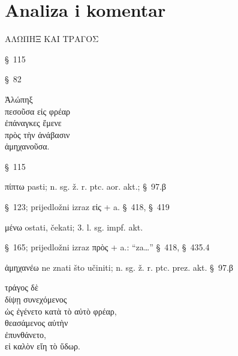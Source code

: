 \section*{Analiza i komentar}


{\large
\begin{greek}
\noindent ΑΛΩΠΗΞ ΚΑΙ ΤΡΑΓΟΣ\\

\end{greek}
}

\begin{description}[noitemsep]
\item[ΑΛΩΠΗΞ] §~115
\item[ΤΡΑΓΟΣ] §~82
\end{description}


{\large
\begin{greek}
\noindent Ἀλώπηξ \\
\tabto{2em} πεσοῦσα εἰς φρέαρ \\
ἐπάναγκες ἔμενε \\
\tabto{2em} πρὸς τὴν ἀνάβασιν \\
\tabto{4em} ἀμηχανοῦσα. \\

\end{greek}
}

\begin{description}[noitemsep]
\item[Ἀλώπηξ] §~115
\item[πεσοῦσα] πίπτω pasti; n. sg. ž. r. ptc. aor. akt.; §~97.β
\item[εἰς φρέαρ] §~123; prijedložni izraz εἰς + a. §~418, §~419
\item[ἔμενε] μένω ostati, čekati; 3. l. sg. impf. akt.
\item[πρὸς τὴν ἀνάβασιν] §~165; prijedložni izraz πρὸς + a.: ``za\dots''  §~418, §~435.4
\item[ἀμηχανοῦσα] ἀμηχανέω ne znati što učiniti; n. sg. ž. r. ptc. prez. akt. §~97.β

\end{description}


{\large
\begin{greek}
\noindent τράγος δὲ\\
\tabto{2em} δίψῃ συνεχόμενος \\
\tabto{4em} ὡς ἐγένετο κατὰ τὸ αὐτὸ φρέαρ, \\
θεασάμενος αὐτὴν \\
ἐπυνθάνετο, \\
\tabto{2em} εἰ καλὸν εἴη τὸ ὕδωρ.\\

\end{greek}
}


